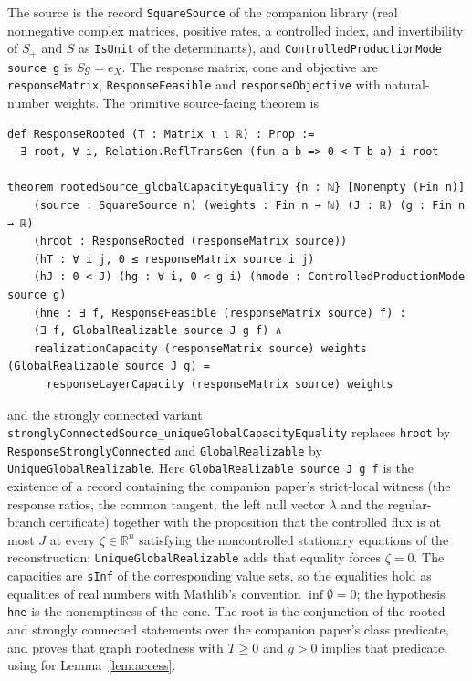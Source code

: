 \documentclass[11pt,a4paper]{article}
\theoremstyle{plain}
\theoremstyle{definition}
\theoremstyle{remark}
\numberwithin{equation}{section}
\newcommand{\R}{\mathbb{R}}
\newcommand{\Sp}{S_{+}}
\begin{document}
The source is the record \texttt{SquareSource} of the companion library (real nonnegative complex matrices, positive rates, a controlled index, and invertibility of $\Sp$ and $S$ as \texttt{IsUnit} of the determinants), and \texttt{ControlledProductionMode source g} is $Sg=e_X$. The response matrix, cone and objective are \texttt{responseMatrix}, \texttt{ResponseFeasible} and \texttt{responseObjective} with natural-number weights. The primitive source-facing theorem is
\begin{lstlisting}
def ResponseRooted (T : Matrix ι ι ℝ) : Prop :=
  ∃ root, ∀ i, Relation.ReflTransGen (fun a b => 0 < T b a) i root

theorem rootedSource_globalCapacityEquality {n : ℕ} [Nonempty (Fin n)]
    (source : SquareSource n) (weights : Fin n → ℕ) (J : ℝ) (g : Fin n → ℝ)
    (hroot : ResponseRooted (responseMatrix source))
    (hT : ∀ i j, 0 ≤ responseMatrix source i j)
    (hJ : 0 < J) (hg : ∀ i, 0 < g i) (hmode : ControlledProductionMode source g)
    (hne : ∃ f, ResponseFeasible (responseMatrix source) f) :
    (∃ f, GlobalRealizable source J g f) ∧
    realizationCapacity (responseMatrix source) weights (GlobalRealizable source J g) =
      responseLayerCapacity (responseMatrix source) weights
\end{lstlisting}
and the strongly connected variant \texttt{stronglyConnectedSource\_\allowbreak uniqueGlobal\allowbreak Capacity\allowbreak Equality} replaces \texttt{hroot} by \texttt{ResponseStronglyConnected} and \texttt{GlobalRealizable} by \texttt{UniqueGlobalRealizable}. Here \texttt{GlobalRealizable source J g f} is the existence of a record containing the companion paper's strict-local witness (the response ratios, the common tangent, the left null vector $\lambda$ and the regular-branch certificate) together with the proposition that the controlled flux is at most $J$ at every $\zeta\in\R^n$ satisfying the noncontrolled stationary equations of the reconstruction; \texttt{UniqueGlobalRealizable} adds that equality forces $\zeta=0$. The capacities are \texttt{sInf} of the corresponding value sets, so the equalities hold as equalities of real numbers with Mathlib's convention $\inf\emptyset=0$; the hypothesis \texttt{hne} is the nonemptiness of the cone. The root  is the conjunction of the rooted and strongly connected statements over the companion paper's class predicate, and  proves that graph rootedness with $T\ge0$ and $g>0$ implies that predicate, using  for Lemma~\ref{lem:access}.
\end{document}
